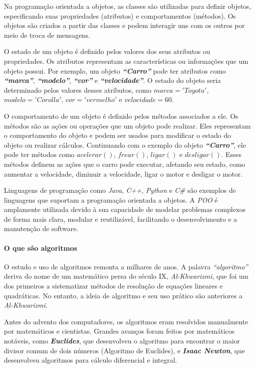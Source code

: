 \documentclass[a4paper, 12pt, onecolumn,singlespacing]{article}
\begin{document}
	Na programação orientada a objetos, as classes são utilizadas para definir objetos, especificando suas propriedades (atributos) e comportamentos (métodos). Os objetos são criados a partir das classes e podem interagir uns com os outros por meio de troca de mensagens.
	
	O estado de um objeto é definido pelos valores dos seus atributos ou propriedades. Os atributos representam as características ou informações que um objeto possui. Por exemplo, um objeto \textbf{\textit{``Carro''}} pode ter atributos como \textbf{\textit{``marca''}}, \textbf{\textit{``modelo''}}, \textbf{\textit{``cor''}} e \textbf{\textit{``velocidade''}}. O estado do objeto seria determinado pelos valores desses atributos, como $marca = 'Toyota'$, $modelo = 'Corolla'$, $cor = 'vermelho'$ e $velocidade = 60$.
	
	O comportamento de um objeto é definido pelos métodos associados a ele. Os métodos são as ações ou operações que um objeto pode realizar. Eles representam o comportamento do objeto e podem ser usados para modificar o estado do objeto ou realizar cálculos. Continuando com o exemplo do objeto \textbf{\textit{``Carro''}}, ele pode ter métodos como $acelerar()$, $frear()$, $ligar()$ e $desligar()$. Esses métodos definem as ações que o carro pode executar, afetando seu estado, como aumentar a velocidade, diminuir a velocidade, ligar o motor e desligar o motor.
	
	Linguagens de programação como \textit{Java}, \textit{C++}, \textit{Python} e \textit{C\#} são exemplos de linguagens que suportam a programação orientada a objetos. A \textit{POO} é amplamente utilizada devido à sua capacidade de modelar problemas complexos de forma mais clara, modular e reutilizável, facilitando o desenvolvimento e a manutenção de software.
	
	\paragraph{O que são algoritmos}
	 \label{o_que_sao_algoritmos} O estudo e uso de algoritmos remonta a milhares de anos. A palavra \textit{``algoritmo''} deriva do nome de um matemático persa do século IX, \textit{Al-Khwarizmi}, que foi um dos primeiros a sistematizar métodos de resolução de equações lineares e quadráticas. No entanto, a ideia de algoritmo e seu uso prático são anteriores a \textit{Al-Khwarizmi}.
	
	Antes do advento dos computadores, os algoritmos eram resolvidos manualmente por matemáticos e cientistas. Grandes avanços foram feitos por matemáticos notáveis, como \textit{\textbf{Euclides}}, que desenvolveu o algoritmo para encontrar o maior divisor comum de dois números (Algoritmo de Euclides), e \textbf{\textit{\textit{Isaac Newton}}}, que desenvolveu algoritmos para cálculo diferencial e integral.
	
\end{document}
